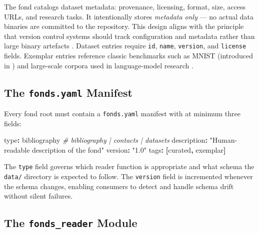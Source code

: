 \documentclass[
]{article}
\newenvironment{Shaded}{}{}
\newcommand{\AttributeTok}[1]{\textcolor[rgb]{0.49,0.56,0.16}{#1}}
\newcommand{\CommentTok}[1]{\textcolor[rgb]{0.38,0.63,0.69}{\textit{#1}}}
\newcommand{\FunctionTok}[1]{\textcolor[rgb]{0.02,0.16,0.49}{#1}}
\newcommand{\KeywordTok}[1]{\textcolor[rgb]{0.00,0.44,0.13}{\textbf{#1}}}
\newcommand{\StringTok}[1]{\textcolor[rgb]{0.25,0.44,0.63}{#1}}
\begin{document}
\subsubsection{\texorpdfstring{}{template_datasets}}\label{template_datasets}

The  fond catalogs dataset metadata:
provenance, licensing, format, size, access URLs, and research tasks. It
intentionally stores \emph{metadata only} --- no actual data binaries
are committed to the repository. This design aligns with the principle
that version control systems should track configuration and metadata
rather than large binary artefacts \citep{Kluyver2016jupyter}. Dataset
entries require \texttt{id}, \texttt{name}, \texttt{version}, and
\texttt{license} fields. Exemplar entries reference classic benchmarks
such as MNIST (introduced in \citep{LeCun1998gradient}) and large-scale
corpora used in language-model research \citep{Brown2020gpt3}.

\subsection{\texorpdfstring{The \texttt{fonds.yaml}
Manifest}{The fonds.yaml Manifest}}\label{the-fonds.yaml-manifest}

Every fond root must contain a \texttt{fonds.yaml} manifest with at
minimum three fields:

\begin{Shaded}
\begin{Highlighting}[]
\FunctionTok{type}\KeywordTok{:}\AttributeTok{ bibliography}\CommentTok{   \# bibliography | contacts | datasets}
\FunctionTok{description}\KeywordTok{:}\AttributeTok{ }\StringTok{"Human{-}readable description of the fond"}
\FunctionTok{version}\KeywordTok{:}\AttributeTok{ }\StringTok{"1.0"}
\FunctionTok{tags}\KeywordTok{:}\AttributeTok{ }\KeywordTok{[}\AttributeTok{curated}\KeywordTok{,}\AttributeTok{ exemplar}\KeywordTok{]}
\end{Highlighting}
\end{Shaded}

The \texttt{type} field governs which reader function is appropriate and
what schema the \texttt{data/} directory is expected to follow. The
\texttt{version} field is incremented whenever the schema changes,
enabling consumers to detect and handle schema drift without silent
failures.

\subsection{\texorpdfstring{The \texttt{fonds\_reader}
Module}{The fonds_reader Module}}\label{the-fonds_reader-module}
\end{document}
